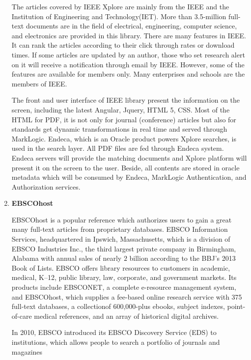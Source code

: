 \begin{enumerate}
	The articles covered by IEEE Xplore are mainly from the IEEE and the Institution of Engineering and Technology(IET).
	More than 3.5-million full-text documents are in the field of electrical, engineering, computer science, and electronics are provided in this library. 
	There are many features in IEEE. It can rank the articles according to their click through rates or download times. 
    If some articles are updated by an author, those who set research alert on it will receive a notification through email by IEEE.
    However, some of the features are available for members only.
    Many enterprises and schools are the members of IEEE.
    
	The front and user interface of IEEE library present the information on the screen, including the latest Angular, Jquery, HTML 5, CSS.
	Most of the HTML for PDF,  it is not only for journal (conference) articles but also for standards get dynamic transformations in real time and served through MarkLogic.
	Endeca, which is an Oracle product powers Xplore searches, is used in the search layer.
	All PDF files are fed through Endeca system.
	Endeca servers will provide the matching documents and Xplore platform will present it on the screen to the user.
	Beside, all contents are stored in oracle metadata which will be consumed by Endeca, MarkLogic Authentication, and Authorization services.
	
	\item\textbf{EBSCOhost}
	\setlength{\parindent}{1em}

	EBSCOhost is a popular reference which authorizes users to gain a great many full-text articles from proprietary databases.
	EBSCO Information Services, headquartered in Ipswich, Massachusetts, which is a division of EBSCO Industries Inc., the third largest private company in Birmingham, Alabama with annual sales of nearly $2$ billion according to the BBJ's 2013 Book of Lists.
    EBSCO offers library resources to customers in academic, medical, K–12, public library, law, corporate, and government markets. 
	Its products include EBSCONET, a complete e-resource management system, and EBSCOhost, which supplies a fee-based online research service with 375 full-text databases, a collectionof 600,000-plus ebooks, subject indexes, point-of-care medical references, and an array of historical digital archives.

    In 2010, EBSCO introduced its EBSCO Discovery Service (EDS) to institutions, which allows people to search a portfolio of journals and magazines


\end{enumerate}
